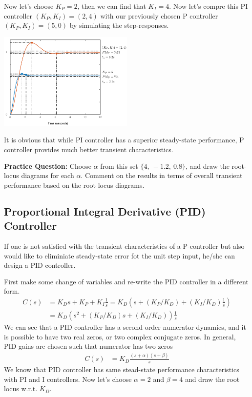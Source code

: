 \documentclass[twoside]{article}
\begin{document}
Now let's choose $K_P = 2$, then we can find that $K_I = 4$.
Now let's compre this PI controller $(K_P , K_I) = (2,4)$ with our
previously chosen P controller $(K_P , K_I) = (5,0)$ by simulating
the step-responses. 

\vspace{12 pt}

  \begin{minipage}[h]{1\linewidth}
    \begin{center}
      \includegraphics[width=0.5\textwidth]{PvsPI}
    \end{center}
  \end{minipage}

\vspace{12 pt}

It is obvious that while PI controller has a superior steady-state
performance, P controller provides much better transient
characteristics. 

\textbf{Practice Question:} Choose $\alpha$ from this set  $\lbrace 4,
\ -1.2, \  0.8  \rbrace$, and draw the root-locus diagrams for each
$\alpha$. Comment on the results in terms of overall transient performance
based on the root locus diagrams.

\subsection{Proportional Integral Derivative (PID) Controller}

If one is not satisfied with the transient characteristics of a
P-controller but also would like to eliminiate steady-state error
fot the unit step input, he/she can design a PID controller. 

First make some change of variables and re-write the PID controller in a different form.
%
\begin{align*}
 C(s) &= K_D s + K_P + K_I \frac{1}{s} = K_D  \left( s +   (K_P/K_D) +
  (K_I/K_D) \frac{1}{s} \right)\\
&= K_D  \left( s^2 +   (K_P/K_D) s  + (K_I/K_D) \right) \frac{1}{s}
\end{align*}
%
We can see that a PID controller has a second order numerator
dynamics, and it is possible to have two real zeros, or two complex
conjugate zeros. In general, PID gains are chosen such that 
numerator has two zeros
\begin{align*}
 C(s) &= K_D \frac{(s+\alpha) (s + \beta)}{s}
\end{align*}
%
We know that PID controller has same stead-state performance
characteristics with PI and I controllers. Now let's choose $\alpha =
2$ and $\beta = 4$ and draw the root locus w.r.t. $K_D$.
\end{document}
